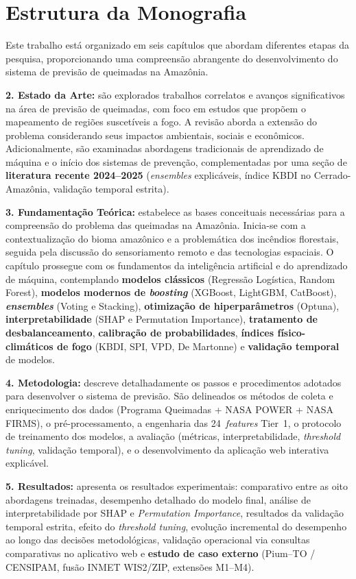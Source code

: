 \section{Estrutura da Monografia}

Este trabalho está organizado em seis capítulos que abordam diferentes etapas da pesquisa, proporcionando uma compreensão abrangente do desenvolvimento do sistema de previsão de queimadas na Amazônia.

\textbf{2. Estado da Arte:} são explorados trabalhos correlatos e avanços significativos na área de previsão de queimadas, com foco em estudos que propõem o mapeamento de regiões suscetíveis a fogo. A revisão aborda a extensão do problema considerando seus impactos ambientais, sociais e econômicos. Adicionalmente, são examinadas abordagens tradicionais de aprendizado de máquina e o início dos sistemas de prevenção, complementadas por uma seção de \textbf{literatura recente 2024--2025} (\emph{ensembles} explicáveis, índice KBDI no Cerrado-Amazônia, validação temporal estrita).

\textbf{3. Fundamentação Teórica:} estabelece as bases conceituais necessárias para a compreensão do problema das queimadas na Amazônia. Inicia-se com a contextualização do bioma amazônico e a problemática dos incêndios florestais, seguida pela discussão do sensoriamento remoto e das tecnologias espaciais. O capítulo prossegue com os fundamentos da inteligência artificial e do aprendizado de máquina, contemplando \textbf{modelos clássicos} (Regressão Logística, Random Forest), \textbf{modelos modernos de \emph{boosting}} (XGBoost, LightGBM, CatBoost), \textbf{\emph{ensembles}} (Voting e Stacking), \textbf{otimização de hiperparâmetros} (Optuna), \textbf{interpretabilidade} (SHAP e Permutation Importance), \textbf{tratamento de desbalanceamento}, \textbf{calibração de probabilidades}, \textbf{índices físico-climáticos de fogo} (KBDI, SPI, VPD, De Martonne) e \textbf{validação temporal} de modelos.

\textbf{4. Metodologia:} descreve detalhadamente os passos e procedimentos adotados para desenvolver o sistema de previsão. São delineados os métodos de coleta e enriquecimento dos dados (Programa Queimadas + NASA POWER + NASA FIRMS), o pré-processamento, a engenharia das 24~\emph{features} Tier~1, o protocolo de treinamento dos modelos, a avaliação (métricas, interpretabilidade, \emph{threshold tuning}, validação temporal), e o desenvolvimento da aplicação web interativa explicável.

\textbf{5. Resultados:} apresenta os resultados experimentais: comparativo entre as oito abordagens treinadas, desempenho detalhado do modelo final, análise de interpretabilidade por SHAP e \emph{Permutation Importance}, resultados da validação temporal estrita, efeito do \emph{threshold tuning}, evolução incremental do desempenho ao longo das decisões metodológicas, validação operacional via consultas comparativas no aplicativo web e \textbf{estudo de caso externo} (Pium--TO / CENSIPAM, fusão INMET WIS2/ZIP, extensões M1--M4).

